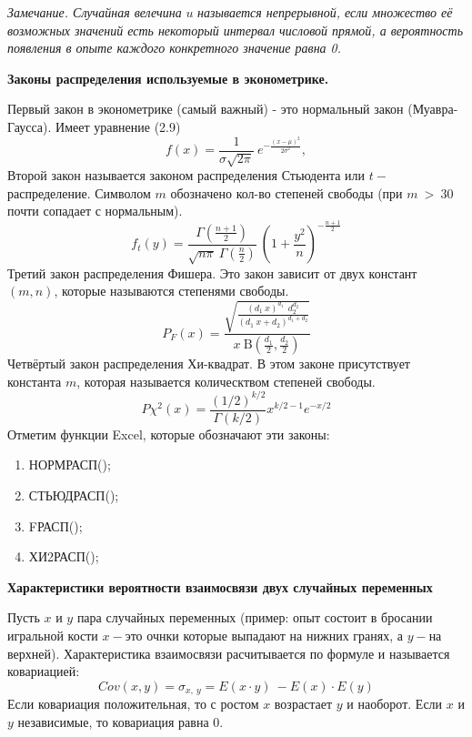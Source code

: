 \documentclass[12pt,a4paper]{article}
\begin{document}
\textit{Замечание}\textit{. Случайная велечина }$\displaystyle u$\textit{ называется непрерывной, если множество её возможных значений есть некоторый интервал числовой прямой, а вероятность появления в опыте каждого конкретного значение равна 0.}

\textbf{Законы распределения используемые в эконометрике.}

Первый закон в эконометрике (самый важный) - это нормальный закон (Муавра-Гаусса). Имеет уравнение (2.9)
\begin{equation*}
{\displaystyle f(x)=\frac{1}{\sigma \sqrt{2\pi }} \ e^{-\frac{(x-\mu )^{2}}{2\sigma ^{2}}} ,}
\end{equation*}
Второй закон называется законом распределения Стьюдента или $\displaystyle t-$распределение. Символом $\displaystyle m$ обозначено кол-во степеней свободы (при $\displaystyle m\  >\ 30$ почти сопадает с нормальным).
\begin{equation*}
{\displaystyle f_{t} (y)=\frac{\Gamma \left(\frac{n+1}{2}\right)}{\sqrt{n\pi } \ \Gamma \left(\frac{n}{2}\right)} \ \left( 1+\frac{y^{2}}{n}\right)^{-\frac{n+1}{2}}}
\end{equation*}
Третий закон распределения Фишера. Это закон зависит от двух констант $\displaystyle ( m,n)$, которые называются степенями свободы.
\begin{equation*}
{\displaystyle P_{F}( x) =\frac{\sqrt{\frac{(d_{1} \ x)^{d_{1}} \ \ d^{d_{2}}_{2}}{(d_{1} \ x+d_{2} )^{d_{1} +d_{2}}}}}{x\ \mathrm{B}\left(\frac{d_{1}}{2} ,\frac{d_{2}}{2}\right)}}
\end{equation*}
Четвёртый закон распределения Хи-квадрат. В этом законе присутствует константа $\displaystyle m$, которая называется колическтвом степеней свободы.
\begin{equation*}
{\displaystyle P\chi ^{2}( x) =\frac{(1/2)^{k/2}}{\Gamma (k/2)} x^{k/2-1} e^{-x/2}}
\end{equation*}
Отметим функции Excel, которые обозначают эти законы:
\begin{enumerate}
\item НОРМРАСП();
\item СТЬЮДРАСП();
\item FРАСП();
\item ХИ2РАСП();
\end{enumerate}
\begin{center}
\textbf{Характеристики вероятности взаимосвязи двух случайных переменных}
\end{center}
Пусть $\displaystyle x$ и $\displaystyle y$ пара случайных переменных (пример: опыт состоит в бросании игральной кости $\displaystyle x-$это очнки которые выпадают на нижних гранях, а $\displaystyle y-$на верхней). Характеристика взаимосвязи расчитывается по формуле и называется ковариацией:
\begin{equation*}
Cov( x,y) =\sigma _{x,\ y} =E( x\cdot y) \ -E( x) \cdot E( y)
\end{equation*}
Если ковариация положительная, то с ростом $\displaystyle x$ возрастает $\displaystyle y$ и наоборот. Если $\displaystyle x$ и $\displaystyle y$ независимые, то ковариация равна 0.
\end{document}
